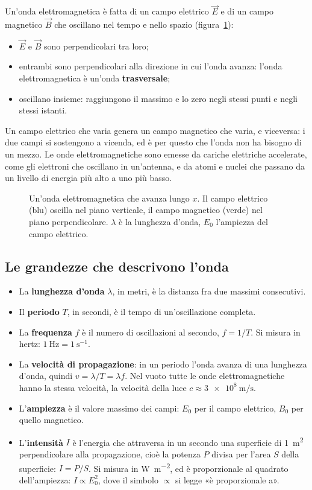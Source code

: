 Un'onda elettromagnetica è fatta di un campo elettrico $\vec E$ e di un campo magnetico $\vec B$ che oscillano nel tempo e nello spazio (figura~\ref{fig:ud7-onda-em}):
\begin{itemize}
  \item $\vec E$ e $\vec B$ sono perpendicolari tra loro;
  \item entrambi sono perpendicolari alla direzione in cui l'onda avanza: l'onda elettromagnetica è un'onda \textbf{trasversale};
  \item oscillano insieme: raggiungono il massimo e lo zero negli stessi punti e negli stessi istanti.
\end{itemize}
Un campo elettrico che varia genera un campo magnetico che varia, e viceversa: i due campi si sostengono a vicenda, ed è per questo che l'onda non ha bisogno di un mezzo. Le onde elettromagnetiche sono emesse da cariche elettriche accelerate, come gli elettroni che oscillano in un'antenna, e da atomi e nuclei che passano da un livello di energia più alto a uno più basso.

\begin{figure}[h]
\centering

\caption{Un'onda elettromagnetica che avanza lungo $x$. Il campo elettrico (blu) oscilla nel piano verticale, il campo magnetico (verde) nel piano perpendicolare. $\lambda$ è la lunghezza d'onda, $E_0$ l'ampiezza del campo elettrico.}
\label{fig:ud7-onda-em}
\end{figure}

\subsection{Le grandezze che descrivono l'onda}

\begin{itemize}
  \item La \textbf{lunghezza d'onda} $\lambda$, in metri, è la distanza fra due massimi consecutivi.
  \item Il \textbf{periodo} $T$, in secondi, è il tempo di un'oscillazione completa.
  \item La \textbf{frequenza} $f$ è il numero di oscillazioni al secondo, $f = 1/T$. Si misura in hertz: $\SI{1}{\hertz} = \SI[per-mode=power]{1}{\second\tothe{-1}}$.
  \item La \textbf{velocità di propagazione}: in un periodo l'onda avanza di una lunghezza d'onda, quindi $v = \lambda/T = \lambda f$. Nel vuoto tutte le onde elettromagnetiche hanno la stessa velocità, la velocità della luce $c \approx \SI{3e8}{\metre\per\second}$.
  \item L'\textbf{ampiezza} è il valore massimo dei campi: $E_0$ per il campo elettrico, $B_0$ per quello magnetico.
  \item L'\textbf{intensità} $I$ è l'energia che attraversa in un secondo una superficie di \SI{1}{\metre\squared} perpendicolare alla propagazione, cioè la potenza $P$ divisa per l'area $S$ della superficie: $I = P/S$. Si misura in \si{\watt\per\metre\squared}, ed è proporzionale al quadrato dell'ampiezza: $I \propto E_0^2$, dove il simbolo $\propto$ si legge «è proporzionale a».
\end{itemize}

